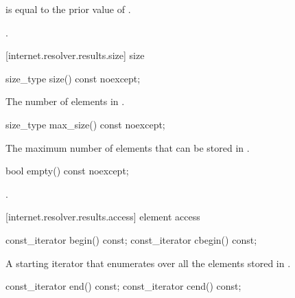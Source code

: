 \begin{itemdescr}
\pnum
\postconditions {} is equal to the prior value of .

\pnum
\returns {}.
\end{itemdescr}



[internet.resolver.results.size]{ size}

\begin{itemdecl}
size_type size() const noexcept;
\end{itemdecl}

\begin{itemdescr}
\pnum
\returns The number of  elements in .
\end{itemdescr}

\begin{itemdecl}
size_type max_size() const noexcept;
\end{itemdecl}

\begin{itemdescr}
\pnum
\returns The maximum number of  elements that can be stored in .
\end{itemdescr}

\begin{itemdecl}
bool empty() const noexcept;
\end{itemdecl}

\begin{itemdescr}
\pnum
\returns {}.
\end{itemdescr}



[internet.resolver.results.access]{ element access}

\begin{itemdecl}
const_iterator begin() const;
const_iterator cbegin() const;
\end{itemdecl}

\begin{itemdescr}
\pnum
\returns A starting iterator that enumerates over all the  elements stored in .
\end{itemdescr}

\begin{itemdecl}
const_iterator end() const;
const_iterator cend() const;
\end{itemdecl}

